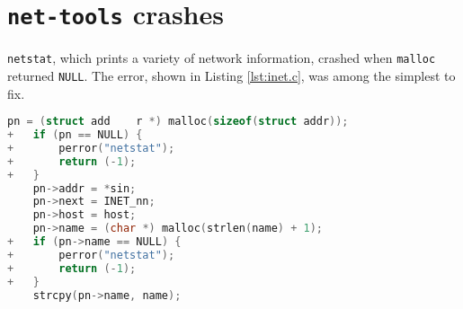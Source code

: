 \section{\texttt{net-tools} crashes}
\label{appendix:net-tools}

\texttt{netstat}, which prints a variety of network information, crashed when \texttt{malloc} returned \texttt{NULL}. The error, shown in Listing \ref{lst:inet.c}, was among the simplest to fix.

\begin{lstlisting}[label={lst:inet.c},firstnumber=213, caption={\texttt{lib/inet.c}}, language=C]
    pn = (struct add	r *) malloc(sizeof(struct addr));
+   if (pn == NULL) {
+   	perror("netstat");
+		return (-1);
+   }
    pn->addr = *sin;
    pn->next = INET_nn;
    pn->host = host;
    pn->name = (char *) malloc(strlen(name) + 1);
+   if (pn->name == NULL) {
+   	perror("netstat");
+		return (-1);
+   }
    strcpy(pn->name, name);
\end{lstlisting}
